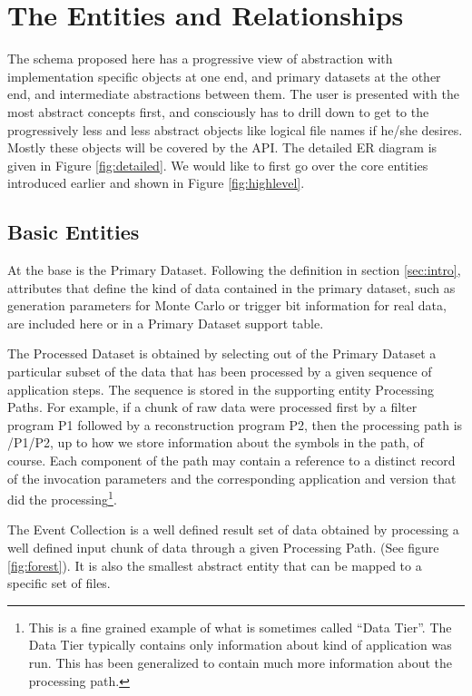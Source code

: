 \documentclass{cmspaper}
\begin{document}
\section{The Entities and Relationships}
\label{sec:details}

The schema proposed here has a progressive view of abstraction 
with implementation specific objects at one end, and primary datasets at the 
other end, and 
intermediate abstractions between them.  The user is presented with the most
abstract concepts first, and consciously has to drill 
down to get to the progressively less and less abstract objects like 
logical file names if he/she desires.  Mostly these objects will be covered by 
the API.  The detailed ER diagram is given in Figure \ref{fig:detailed}. We 
would like to first go over the core entities introduced earlier and
shown in Figure \ref{fig:highlevel}.

\subsection{Basic Entities}

At the base is the Primary Dataset.  
Following the definition in section \ref{sec:intro},  
attributes that define the kind of data contained in the 
primary dataset, such as generation parameters for Monte Carlo or 
trigger bit information for real data, are included here or in a 
Primary Dataset support table.  

The Processed Dataset is obtained by 
selecting out of the Primary Dataset a particular subset of the data that has been 
processed by a given sequence of application steps.  The sequence is stored 
in the supporting entity Processing Paths.  For example,
if a chunk of raw data were processed first by a filter program P1 followed 
by a reconstruction program P2, then the processing path is /P1/P2, up to how we
store information about the symbols in the path, of course.  Each component 
of the path may contain a reference to a distinct record of the 
invocation parameters and the corresponding application and version that did 
the processing\footnote{This is a fine grained example of what is sometimes called
``Data Tier''.  The Data Tier typically contains only information about kind
of application was run.  This has been generalized to contain much more information 
about the processing path.}. 

The Event Collection is a well defined result set of data obtained by processing a 
well defined input chunk of data through a given Processing Path.  (See figure \ref{fig:forest}).
It is also the smallest abstract entity that can be mapped to a specific set of files.
\end{document}
